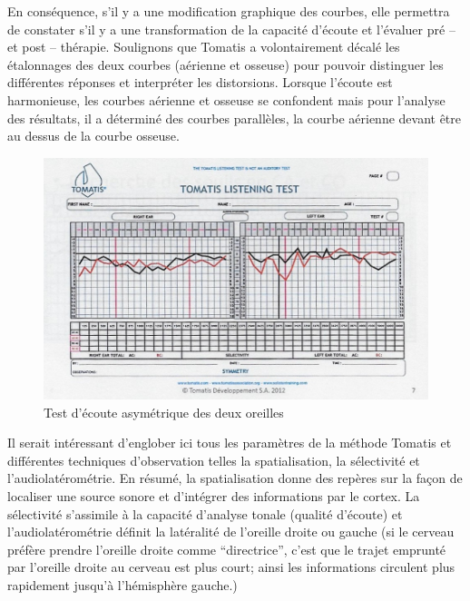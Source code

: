  En  conséquence,  s'il y a une modification
          graphique des courbes, elle
          permettra de constater s'il y a une transformation de la capacité d'écoute
          et l'évaluer pré -- et
          post -- thérapie.
Soulignons que Tomatis a volontairement décalé les étalonnages des deux courbes (aérienne et 
osseuse) pour pouvoir distinguer les différentes réponses et interpréter
	les distorsions. Lorsque l'écoute est harmonieuse, les
	courbes aérienne et osseuse se confondent mais pour l'analyse des
	résultats, il a déterminé des courbes parallèles, la courbe aérienne
	devant être au dessus de la courbe osseuse.
\begin{figure}
	\centering
	\includegraphics[width=0.8\linewidth]{images/tomatisListeningTest.jpg}
	\caption[Test d'écoute]{Test
          d'écoute asymétrique des deux oreilles}
	\label{Test d'écoute asymétrique avec oreille droite et oreille gauche}
\end{figure}
 Il serait intéressant d'englober ici tous les paramètres de la méthode Tomatis 
 et différentes techniques 
 d'observation telles la spatialisation, la sélectivité et l'audiolatérométrie. 
 En résumé, la spatialisation donne des repères sur la façon de localiser une source sonore et d'intégrer 
 des informations par le cortex. La sélectivité s'assimile à la capacité d'analyse tonale (qualité d'écoute) 
 et l'audiolatérométrie définit la latéralité de l'oreille droite ou gauche (si le cerveau préfère prendre 
 l'oreille droite comme
 ``directrice'', c'est que le trajet emprunté par l'oreille droite au cerveau est plus
 court; ainsi les informations circulent plus rapidement jusqu'à l'hémisphère gauche.)
